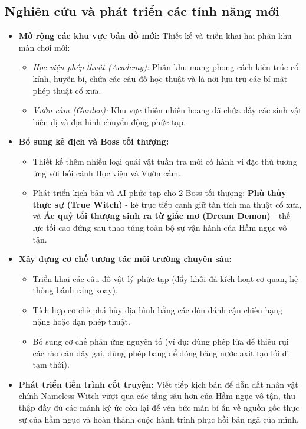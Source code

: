 \documentclass[../DoAn.tex]{subfiles}
\begin{document}
\subsection{Nghiên cứu và phát triển các tính năng mới}
\begin{itemize}
    \item \textbf{Mở rộng các khu vực bản đồ mới:} Thiết kế và triển khai hai phân khu màn chơi mới:
    \begin{itemize}
        \item \textit{Học viện phép thuật (Academy):} Phân khu mang phong cách kiến trúc cổ kính, huyền bí, chứa các câu đố học thuật và là nơi lưu trữ các bí mật phép thuật cổ xưa.
        \item \textit{Vườn cấm (Garden):} Khu vực thiên nhiên hoang dã chứa đầy các sinh vật biến dị và địa hình chuyển động phức tạp.
    \end{itemize}
    \item \textbf{Bổ sung kẻ địch và Boss tối thượng:}
    \begin{itemize}
        \item Thiết kế thêm nhiều loại quái vật tuần tra mới có hành vi đặc thù tương ứng với bối cảnh Học viện và Vườn cấm.
        \item Phát triển kịch bản và AI phức tạp cho 2 Boss tối thượng: \textbf{Phù thủy thực sự (True Witch)} - kẻ trực tiếp canh giữ tàn tích ma thuật cổ xưa, và \textbf{Ác quỷ tối thượng sinh ra từ giấc mơ (Dream Demon)} - thế lực tối cao đứng sau thao túng toàn bộ sự vận hành của Hầm ngục vô tận.
    \end{itemize}
    \item \textbf{Xây dựng cơ chế tương tác môi trường chuyên sâu:}
    \begin{itemize}
        \item Triển khai các câu đố vật lý phức tạp (đẩy khối đá kích hoạt cơ quan, hệ thống bánh răng xoay).
        \item Tích hợp cơ chế phá hủy địa hình bằng các đòn đánh cận chiến hạng nặng hoặc đạn phép thuật.
        \item Bổ sung cơ chế phản ứng nguyên tố (ví dụ: dùng phép lửa để thiêu rụi các rào cản dây gai, dùng phép băng để đóng băng nước axit tạo lối đi tạm thời).
    \end{itemize}
    \item \textbf{Phát triển tiến trình cốt truyện:} Viết tiếp kịch bản để dẫn dắt nhân vật chính Nameless Witch vượt qua các tầng sâu hơn của Hầm ngục vô tận, thu thập đầy đủ các mảnh ký ức còn lại để vén bức màn bí ẩn về nguồn gốc thực sự của hầm ngục và hoàn thành cuộc hành trình phục hồi bản ngã của mình.
\end{itemize}
\end{document}
